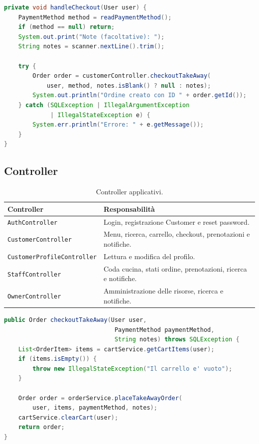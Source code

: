 \documentclass[12pt,a4paper]{article}
\newcommand{\code}[1]{\nolinkurl{#1}}
\begin{document}
\begin{lstlisting}[style=codeStyle,language=Java,
caption={La CLI gestisce input e output, delegando il caso d'uso.}]
private void handleCheckout(User user) {
    PaymentMethod method = readPaymentMethod();
    if (method == null) return;
    System.out.print("Note (facoltative): ");
    String notes = scanner.nextLine().trim();

    try {
        Order order = customerController.checkoutTakeAway(
            user, method, notes.isBlank() ? null : notes);
        System.out.println("Ordine creato con ID " + order.getId());
    } catch (SQLException | IllegalArgumentException
             | IllegalStateException e) {
        System.err.println("Errore: " + e.getMessage());
    }
}
\end{lstlisting}

\subsection{Controller}

\begin{table}[H]
\centering
{}
\begin{tabular}{p{4.4cm}p{9.6cm}}
\toprule
\textbf{Controller} & \textbf{Responsabilità} \\
\midrule
\code{AuthController} & Login, registrazione Customer e reset password. \\
\code{CustomerController} & Menu, ricerca, carrello, checkout, prenotazioni e notifiche. \\
\code{CustomerProfile}\newline\code{Controller} & Lettura e modifica del profilo. \\
\code{StaffController} & Coda cucina, stati ordine, prenotazioni, ricerca e notifiche. \\
\code{OwnerController} & Amministrazione delle risorse, ricerca e notifiche. \\
\bottomrule
\end{tabular}
\caption{Controller applicativi.}
\end{table}

\begin{lstlisting}[style=codeStyle,language=Java,
caption={Coordinamento del checkout nel CustomerController.}]
public Order checkoutTakeAway(User user,
                               PaymentMethod paymentMethod,
                               String notes) throws SQLException {
    List<OrderItem> items = cartService.getCartItems(user);
    if (items.isEmpty()) {
        throw new IllegalStateException("Il carrello e' vuoto");
    }

    Order order = orderService.placeTakeAwayOrder(
        user, items, paymentMethod, notes);
    cartService.clearCart(user);
    return order;
}
\end{lstlisting}
\end{document}
